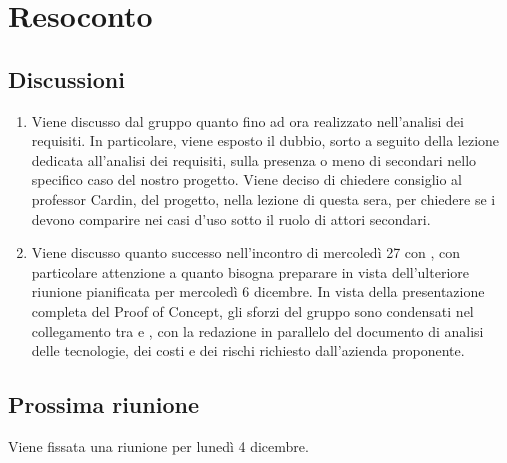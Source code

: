 \section{Resoconto} \label{sec:resoconto}
\subsection{Discussioni} \label{subsec:resdiscussione}
\begin{enumerate}
    \item Viene discusso dal gruppo quanto fino ad ora realizzato nell'analisi dei requisiti. In particolare, viene esposto il dubbio, sorto a seguito della lezione dedicata all'analisi dei requisiti, sulla presenza o meno di  secondari nello specifico caso del nostro progetto. Viene deciso di chiedere consiglio al professor Cardin,  del progetto, nella lezione di questa sera, per chiedere se i   devono comparire nei casi d'uso sotto il ruolo di attori secondari.
    \item Viene discusso quanto successo nell'incontro di mercoledì 27 con , con particolare attenzione a quanto bisogna preparare in vista dell'ulteriore riunione pianificata per mercoledì 6 dicembre. In vista della presentazione completa del Proof of Concept, gli sforzi del gruppo sono condensati nel collegamento tra  e , con la redazione in parallelo del documento di analisi delle tecnologie, dei costi e dei rischi richiesto dall'azienda proponente.
\end{enumerate}



\subsection{Prossima riunione} \label{subsec:riunione}
Viene fissata una riunione per lunedì 4 dicembre.
